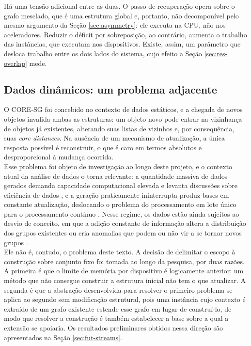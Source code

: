Há uma tensão adicional entre as duas. O passo de recuperação opera sobre o grafo mesclado, que é uma estrutura global e, portanto, não decomponível pelo mesmo argumento da Seção \ref{sec:asymmetry}: ele executa na \ac{CPU}, não nos aceleradores. Reduzir o déficit por sobreposição, ao contrário, aumenta o trabalho das instâncias, que executam nos dispositivos. Existe, assim, um parâmetro que desloca trabalho entre os dois lados do sistema, cujo efeito a Seção \ref{sec:res-overlap} mede.\\

\subsection{Dados dinâmicos: um problema adjacente\label{sec:problem-dynamic}}

O \ac{CORE-SG} foi concebido no contexto de dados estáticos, e a chegada de novos objetos invalida ambas as estruturas: um objeto novo pode entrar na vizinhança de objetos já existentes, alterando suas listas de vizinhos e, por consequência, suas \textit{core distances}. Na ausência de um mecanismo de atualização, a única resposta possível é reconstruir, o que é caro em termos absolutos e desproporcional à mudança ocorrida.\\

Esse problema foi objeto de investigação ao longo deste projeto, e o contexto atual da análise de dados o torna relevante: a quantidade massiva de dados gerados demanda capacidade computacional elevada e levanta discussões sobre eficiência de dados \cite{big-data}, e a geração praticamente ininterrupta produz bases em constante atualização, deslocando o problema do processamento em lote único para o processamento contínuo \cite{data-stream}. Nesse regime, os dados estão ainda sujeitos ao desvio de conceito, em que a adição constante de informação altera a distribuição dos grupos existentes ou cria anomalias que podem ou não vir a se tornar novos grupos \cite{data-stream}.\\

Ele não é, contudo, o problema deste texto. A decisão de delimitar o escopo à construção sobre conjunto fixo foi tomada ao longo da pesquisa, por duas razões. A primeira é que o limite de memória por dispositivo é logicamente anterior: um método que não consegue construir a estrutura inicial não tem o que atualizar. A segunda é que a abstração desenvolvida para resolver o primeiro problema se aplica ao segundo sem modificação estrutural, pois uma instância cujo contexto é extraído de um grafo existente estende esse grafo em lugar de construí-lo, de modo que resolver a construção é também estabelecer a base sobre a qual a extensão se apoiaria. Os resultados preliminares obtidos nessa direção são apresentados na Seção \ref{sec:fut-streams}.\\

